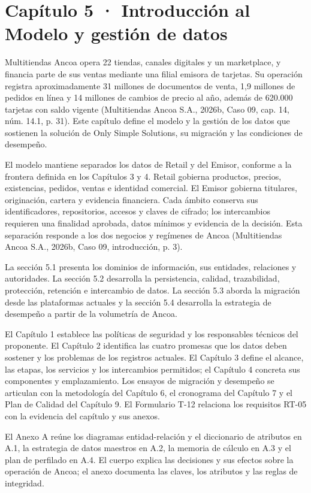 \documentclass[11pt]{article}
\begin{document}
\section{Capítulo 5 · Introducción al Modelo y gestión de datos}

Multitiendas Ancoa opera 22 tiendas, canales digitales y un marketplace, y financia parte de sus ventas mediante una filial emisora de tarjetas. Su operación registra aproximadamente 31 millones de documentos de venta, 1,9 millones de pedidos en línea y 14 millones de cambios de precio al año, además de 620.000 tarjetas con saldo vigente (Multitiendas Ancoa S.A., 2026b, Caso 09, cap. 14, núm. 14.1, p. 31). Este capítulo define el modelo y la gestión de los datos que sostienen la solución de Only Simple Solutions, su migración y las condiciones de desempeño.

El modelo mantiene separados los datos de Retail y del Emisor, conforme a la frontera definida en los Capítulos 3 y 4. Retail gobierna productos, precios, existencias, pedidos, ventas e identidad comercial. El Emisor gobierna titulares, originación, cartera y evidencia financiera. Cada ámbito conserva sus identificadores, repositorios, accesos y claves de cifrado; los intercambios requieren una finalidad aprobada, datos mínimos y evidencia de la decisión. Esta separación responde a los dos negocios y regímenes de Ancoa (Multitiendas Ancoa S.A., 2026b, Caso 09, introducción, p. 3).

La sección 5.1 presenta los dominios de información, sus entidades, relaciones y autoridades. La sección 5.2 desarrolla la persistencia, calidad, trazabilidad, protección, retención e intercambio de datos. La sección 5.3 aborda la migración desde las plataformas actuales y la sección 5.4 desarrolla la estrategia de desempeño a partir de la volumetría de Ancoa.

El Capítulo 1 establece las políticas de seguridad y los responsables técnicos del proponente. El Capítulo 2 identifica las cuatro promesas que los datos deben sostener y los problemas de los registros actuales. El Capítulo 3 define el alcance, las etapas, los servicios y los intercambios permitidos; el Capítulo 4 concreta sus componentes y emplazamiento. Los ensayos de migración y desempeño se articulan con la metodología del Capítulo 6, el cronograma del Capítulo 7 y el Plan de Calidad del Capítulo 9. El Formulario T-12 relaciona los requisitos RT-05 con la evidencia del capítulo y sus anexos.

El Anexo A reúne los diagramas entidad-relación y el diccionario de atributos en A.1, la estrategia de datos maestros en A.2, la memoria de cálculo en A.3 y el plan de perfilado en A.4. El cuerpo explica las decisiones y sus efectos sobre la operación de Ancoa; el anexo documenta las claves, los atributos y las reglas de integridad.
\end{document}
